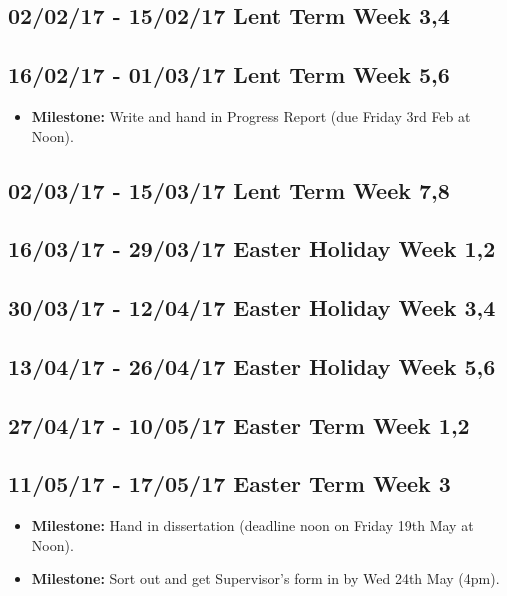 \documentclass[a4paper,12pt]{article}
\begin{document}
    \subsection*{02/02/17 - 15/02/17 \hfill Lent Term Week 3,4}


    \subsection*{16/02/17 - 01/03/17 \hfill Lent Term Week 5,6}

      \begin{itemize}
        \item[]     \textbf{Milestone:} Write and hand in Progress Report (due Friday 3rd Feb at Noon).
      \end{itemize}

    \subsection*{02/03/17 - 15/03/17 \hfill Lent Term Week 7,8}


    \subsection*{16/03/17 - 29/03/17 \hfill Easter Holiday Week 1,2}


    \subsection*{30/03/17 - 12/04/17 \hfill Easter Holiday Week 3,4}


    \subsection*{13/04/17 - 26/04/17 \hfill Easter Holiday Week 5,6}


    \subsection*{27/04/17 - 10/05/17 \hfill Easter Term Week 1,2}


    \subsection*{11/05/17 - 17/05/17 \hfill Easter Term Week 3}

      \begin{itemize}
        \item[] \textbf{Milestone:} Hand in dissertation (deadline noon on Friday 19th May at Noon).

        \item[] \textbf{Milestone:} Sort out and get Supervisor’s form in by Wed 24th May (4pm).
      \end{itemize}
\end{document}
